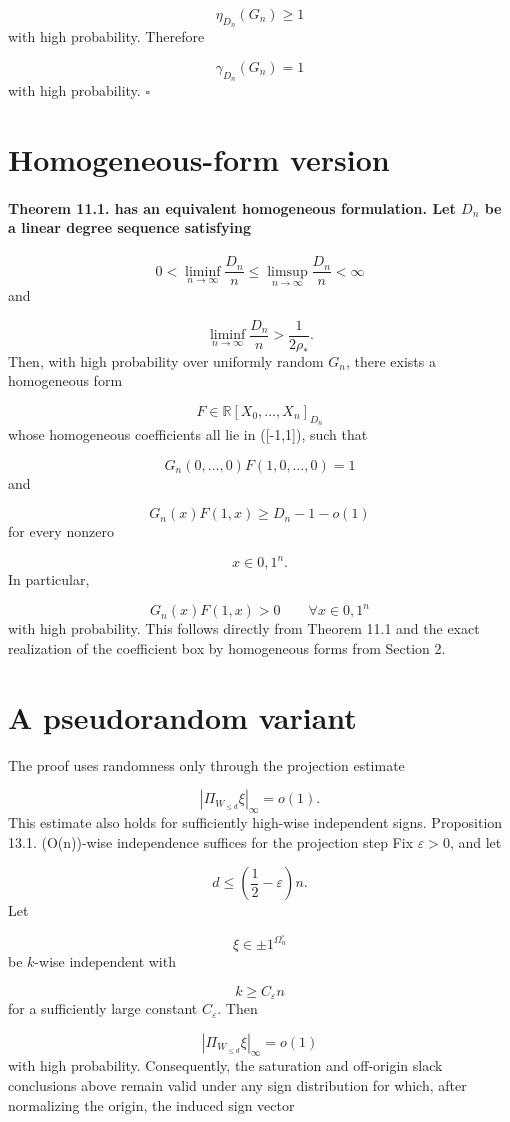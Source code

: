 \documentclass[11pt]{article}
\theoremstyle{definition}
\begin{document}
\[
\eta_{D_n}(G_n)\ge1
\]
with high probability. Therefore

\[
\gamma_{D_n}(G_n)=1
\]
with high probability. $\square$

\section{Homogeneous-form version}
\paragraph{Theorem 11.1. has an equivalent homogeneous formulation. Let $D_n$ be a linear degree sequence satisfying}
\[
0<\liminf_{n\to\infty}\frac{D_n}{n}
\le
\limsup_{n\to\infty}\frac{D_n}{n}
<\infty
\]
and

\[
\liminf_{n\to\infty}\frac{D_n}{n}>
\frac1{2\rho_*}.
\]
Then, with high probability over uniformly random $G_n$, there exists a homogeneous form

\[
F\in \mathbb{R}[X_0,\dots,X_n]_{D_n}
\]
whose homogeneous coefficients all lie in ([-1,1]), such that

\[
G_n(0,\dots,0)F(1,0,\dots,0)=1
\]
and

\[
G_n(x)F(1,x)
\ge
D_n-1-o(1)
\]
for every nonzero

\[
x\in{0,1}^n.
\]
In particular,

\[
G_n(x)F(1,x)>0
\qquad
\forall x\in{0,1}^n
\]
with high probability. This follows directly from Theorem 11.1 and the exact realization of the coefficient box by homogeneous forms from Section 2.

\section{A pseudorandom variant}
The proof uses randomness only through the projection estimate

\[
|\Pi_{W_{\le d}}\xi|_\infty=o(1).
\]
This estimate also holds for sufficiently high-wise independent signs. Proposition 13.1. (O(n))-wise independence suffices for the projection step Fix $\varepsilon>0$, and let

\[
d\le\left(\frac12-\varepsilon\right)n.
\]
Let

\[
\xi\in{\pm1}^{\Omega_n^\circ}
\]
be $k$-wise independent with

\[
k\ge C_\varepsilon n
\]
for a sufficiently large constant $C_\varepsilon$. Then

\[
|\Pi_{W_{\le d}}\xi|_\infty=o(1)
\]
with high probability. Consequently, the saturation and off-origin slack conclusions above remain valid under any sign distribution for which, after normalizing the origin, the induced sign vector
\end{document}
